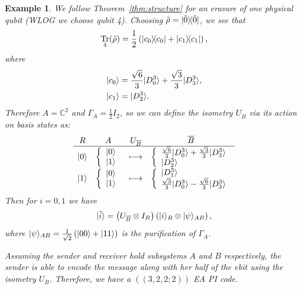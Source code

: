 \documentclass[]{amsart}
\DeclarePairedDelimiter\bra{\langle}{\rvert}
\DeclarePairedDelimiter\ket{\lvert}{\rangle}
\DeclareMathOperator{\Tr}{Tr}
\newtheorem{example}[theorem]{Example}
\begin{document}
\begin{example}
    We follow Theorem~\ref{thm:structure} for an erasure of one physical qubit (WLOG we choose qubit 4). Choosing $\tilde{\rho}=\ket{\tilde{0}}\!\bra{\tilde{0}}$, we see that
    \begin{equation*}
        \Tr_{4}\!\left(\tilde{\rho}\right)=\frac{1}{2}\left(\ket{c_0}\!\bra{c_0}+\ket{c_1}\!\bra{c_1} \right),
    \end{equation*}
    where
    \begin{align*}
        \ket{c_0} & = \frac{\sqrt{6}}{3}\ket{D_0^3}+\frac{\sqrt{3}}{3}\ket{D_3^3}, \\
        \ket{c_1} & = \ket{D_2^3}.
    \end{align*}
    Therefore $A=\mathbb{C}^2$ and $\Gamma_A=\frac{1}{2}I_2$, so we can define the isometry $U_{\overline{B}}$ via its action on basis states as:
    \begin{equation*}
        \begin{array}{cccc} 
            R & A & U_{\overline{B}}  & \overline{B}  \\ \hline 
            \ket{0} & \left\{ \begin{array}{l}  \ket{0} \\ \ket{1} \end{array} \right. & \longmapsto & \left\{ \begin{array}{l} \frac{\sqrt{6}}{3}\ket{D_0^3}+\frac{\sqrt{3}}{3}\ket{D_3^3} \\ \ket{D_2^3}  \end{array} \right. \\ 
            \ket{1} & \left\{ \begin{array}{l}  \ket{0} \\ \ket{1} \end{array} \right. & \longmapsto & \left\{ \begin{array}{l} \ket{D_1^3} \\ \frac{\sqrt{3}}{3}\ket{D_0^3}-\frac{\sqrt{6}}{3}\ket{D_3^3}  \end{array} \right. \\  
        \end{array}
    \end{equation*}
    Then for $i=0,1$ we have
    \begin{equation*}
        \ket{\tilde{i}}=\left(U_{\overline{B}}\otimes I_B\right)\left(\ket{i}_R\otimes\ket{\psi}_{AB}\right),
    \end{equation*}
    where $\ket{\psi}_{AB}=\frac{1}{\sqrt{2}}\left(\ket{00}+\ket{11}\right)$ is the purification of $\Gamma_A$.
    
    Assuming the sender and receiver hold subsystems $A$ and $B$ respectively, the sender is able to encode the message along with her half of the ebit using the isometry $U_{\overline{B}}$.
    Therefore, we have a $\left(\!\left(3,2,2;2\right)\!\right)$ EA PI code.
\end{example}
\end{document}
